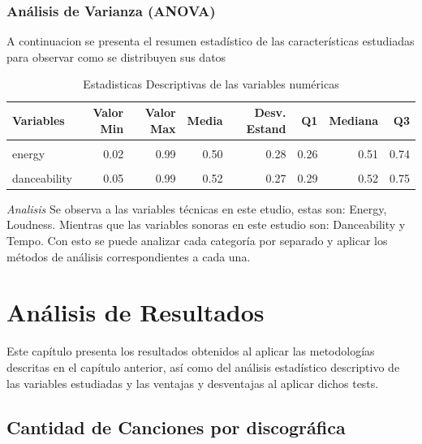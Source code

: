 \documentclass[oneside,11pt]{Latex/Classes/PhDthesisPSnPDF}
\begin{document}
\subsection{Análisis de Varianza (ANOVA)}

A continuacion se presenta el resumen estadístico de las características
estudiadas para observar como se distribuyen sus datos

\begin{table}[!h]
\centering
\caption{\label{tab:anova}Estadisticas Descriptivas de las variables numéricas}
\centering
\fontsize{10}{12}\selectfont
\begin{tabular}[t]{lrrrrrrr}
\toprule
Variables & Valor Min & Valor Max & Media & Desv. Estand & Q1 & Mediana & Q3\\
\midrule
\cellcolor{gray!10}{loudness} & \cellcolor{gray!10}{-54.99} & \cellcolor{gray!10}{-1.00} & \cellcolor{gray!10}{-27.92} & \cellcolor{gray!10}{15.53} & \cellcolor{gray!10}{-41.25} & \cellcolor{gray!10}{-27.76} & \cellcolor{gray!10}{-14.56}\\
energy & 0.02 & 0.99 & 0.50 & 0.28 & 0.26 & 0.51 & 0.74\\
\cellcolor{gray!10}{tempo} & \cellcolor{gray!10}{60.00} & \cellcolor{gray!10}{199.98} & \cellcolor{gray!10}{130.57} & \cellcolor{gray!10}{40.73} & \cellcolor{gray!10}{94.90} & \cellcolor{gray!10}{130.95} & \cellcolor{gray!10}{166.38}\\
danceability & 0.05 & 0.99 & 0.52 & 0.27 & 0.29 & 0.52 & 0.75\\
\bottomrule
\end{tabular}
\end{table}

\emph{Analisis} Se observa a las variables técnicas en este etudio,
estas son: Energy, Loudness. Mientras que las variables sonoras en este
estudio son: Danceability y Tempo. Con esto se puede analizar cada
categoría por separado y aplicar los métodos de análisis
correspondientes a cada una.

\chapter{Análisis de Resultados}

\small Este capítulo presenta los resultados obtenidos al aplicar las
metodologías descritas en el capítulo anterior, así como del análisis
estadístico descriptivo de las variables estudiadas y las ventajas y
desventajas al aplicar dichos tests.

\section{Cantidad de Canciones por discográfica}
\end{document}
